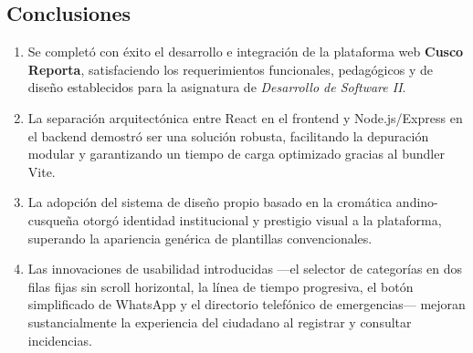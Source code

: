 \documentclass[12pt,a4paper]{article}
\begin{document}
\subsection{Conclusiones}
\begin{enumerate}[leftmargin=*]
    \item Se completó con éxito el desarrollo e integración de la plataforma web \textbf{Cusco Reporta}, satisfaciendo los requerimientos funcionales, pedagógicos y de diseño establecidos para la asignatura de \textit{Desarrollo de Software II}.
    \item La separación arquitectónica entre React en el frontend y Node.js/Express en el backend demostró ser una solución robusta, facilitando la depuración modular y garantizando un tiempo de carga optimizado gracias al bundler Vite.
    \item La adopción del sistema de diseño propio basado en la cromática andino-cusqueña otorgó identidad institucional y prestigio visual a la plataforma, superando la apariencia genérica de plantillas convencionales.
    \item Las innovaciones de usabilidad introducidas —el selector de categorías en dos filas fijas sin scroll horizontal, la línea de tiempo progresiva, el botón simplificado de WhatsApp y el directorio telefónico de emergencias— mejoran sustancialmente la experiencia del ciudadano al registrar y consultar incidencias.
\end{enumerate}
\end{document}
